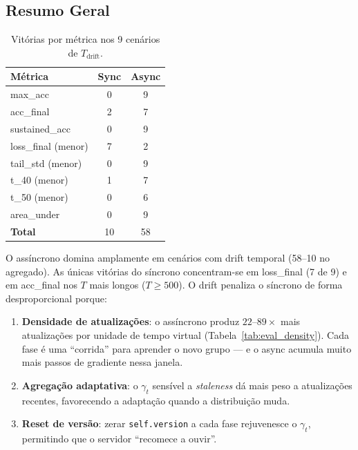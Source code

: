 \documentclass[12pt, a4paper]{article}
\begin{document}
\subsection{Resumo Geral}

\begin{table}[H]
\centering
\caption{Vitórias por métrica nos 9 cenários de $T_{\text{drift}}$.}
\label{tab:summary}
\renewcommand{\arraystretch}{1.25}
\begin{tabular}{lcc}
\toprule
\textbf{Métrica} & \textbf{Sync} & \textbf{Async} \\
\midrule
max\_acc             & 0 & 9 \\
acc\_final           & 2 & 7 \\
sustained\_acc       & 0 & 9 \\
loss\_final (menor)  & 7 & 2 \\
tail\_std (menor)    & 0 & 9 \\
t\_40 (menor)        & 1 & 7 \\
t\_50 (menor)        & 0 & 6 \\
area\_under          & 0 & 9 \\
\midrule
\textbf{Total}       & 10 & 58 \\
\bottomrule
\end{tabular}
\end{table}

O assíncrono domina amplamente em cenários com drift temporal (58--10 no
agregado). As únicas vitórias do síncrono concentram-se em loss\_final (7 de
9) e em acc\_final nos $T$ mais longos ($T \geq 500$). O drift penaliza o
síncrono de forma desproporcional porque:
\begin{enumerate}
    \item \textbf{Densidade de atualizações}: o assíncrono produz
    $22$--$89{\times}$ mais atualizações por unidade de tempo virtual
    (Tabela~\ref{tab:eval_density}). Cada fase é uma ``corrida'' para aprender
    o novo grupo --- e o async acumula muito mais passos de gradiente nessa
    janela.
    \item \textbf{Agregação adaptativa}: o $\gamma_t$ sensível a
    \textit{staleness} dá mais peso a atualizações recentes, favorecendo
    a adaptação quando a distribuição muda.
    \item \textbf{Reset de versão}: zerar \texttt{self.version} a cada fase
    rejuvenesce o $\gamma_t$, permitindo que o servidor ``recomece a ouvir''.
\end{enumerate}

\end{document}
